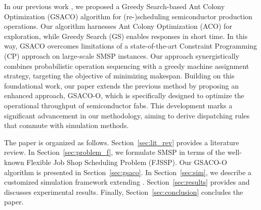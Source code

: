 In our previous work \cite{Ali2024}, we proposed a Greedy Search-based Ant Colony Optimization (GSACO)
algorithm for (re-)scheduling semiconductor production operations. 
Our algorithm harnesses Ant Colony Optimization (ACO) \cite{Dorigo2019} for exploration, while
Greedy Search (GS) \cite{Papadimitriou} enables responses in short time. 
In this way, GSACO overcomes limitations of a state-of-the-art Constraint Programming (CP) approach \cite{Perron2023}
on large-scale SMSP instances. Our approach synergistically combines probabilistic operation sequencing with a greedy machine assignment strategy, targeting %
the objective of minimizing makespan. Building on this foundational work, our paper extends the previous method by proposing an enhanced approach, GSACO-O, which is specifically designed to optimize the operational throughput of semiconductor fabs. This development marks a significant advancement in our methodology, aiming to derive dispatching rules that commute with simulation methods.

The paper is organized as follows. 
Section~\ref{sec:lit_rev} provides a literature review.
In Section~\ref{sec:problem_f}, we formulate SMSP in terms of the well-known Flexible Job Shop Scheduling Problem (FJSSP). 
Our GSACO-O algorithm is presented in Section~\ref{sec:gsaco}.
In Section~\ref{sec:sim}, we describe a customized simulation framework extending \cite{Kovacs2022}.
Section~\ref{sec:results} provides and discusses experimental results.
Finally, Section~\ref{sec:conclusion} concludes the paper.




